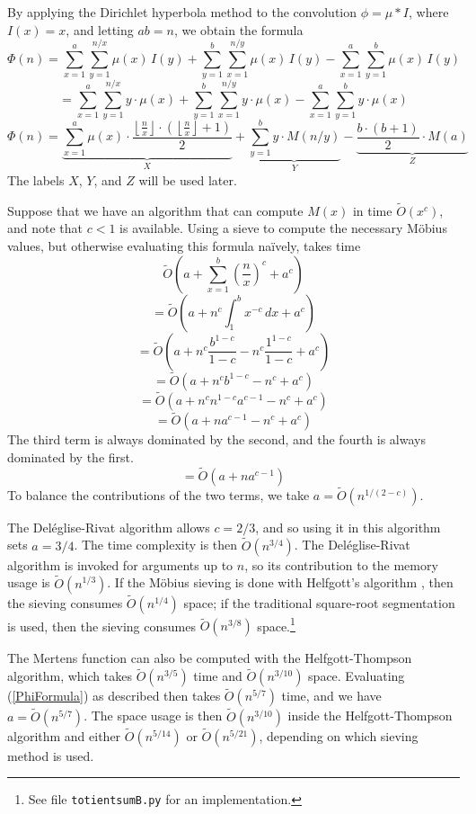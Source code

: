 \documentclass[12pt]{article}
\newcommand{\eqn}[1]{\begin{displaymath} #1 \end{displaymath}}
\newcommand{\neqn}[1]{\begin{equation} #1 \end{equation}}
\newcommand{\floor}[1]{{\left\lfloor #1 \right\rfloor}}
\newcommand{\integral}[4]{\displaystyle\int_{#3}^{#4} \! #1 \, d#2}
\newcommand{\floordiv}[2]{\floor{\frac{#1}{#2}}}
\newcommand{\softO}[0]{\widetilde{O}}
\begin{document}
By applying the Dirichlet hyperbola method to the convolution $\phi = \mu * I$, where $I(x)=x$, and letting $ab=n$, we obtain the formula
\eqn{\Phi(n) = \sum_{x=1}^{a}\sum_{y=1}^{n/x} \mu(x) \, I(y) + \sum_{y=1}^{b}\sum_{x=1}^{n/y} \mu(x) \, I(y) - \sum_{x=1}^{a}\sum_{y=1}^{b} \mu(x) \, I(y)}
\eqn{ = \sum_{x=1}^{a}\sum_{y=1}^{n/x} y \cdot \mu(x) + \sum_{y=1}^{b}\sum_{x=1}^{n/y} y \cdot \mu(x) - \sum_{x=1}^{a}\sum_{y=1}^{b} y \cdot \mu(x)}
\neqn{\Phi(n) = \underbrace{\sum_{x=1}^{a} \mu(x) \cdot \frac{\floordiv{n}{x} \cdot \left(\floordiv{n}{x} + 1\right)}{2}}_{X} + \underbrace{\sum_{y=1}^{b} y \cdot M(n/y)}_{Y} - \underbrace{\frac{b \cdot (b+1)}{2} \cdot M(a)}_{Z} \label{PhiFormula}}
The labels $X$, $Y$, and $Z$ will be used later.

Suppose that we have an algorithm that can compute $M(x)$ in time $\softO(x^c)$, and note that $c < 1$ is available.  Using a sieve to compute the necessary M\"obius values, but otherwise evaluating this formula na\"{i}vely, takes time
\eqn{\softO\left( a + \sum_{x=1}^b \left(\frac{n}{x}\right)^c + a^c \right)}
\eqn{=\softO\left( a + n^c \integral{x^{-c}}{x}{1}{b} + a^c \right)}
\eqn{=\softO\left( a + n^c\frac{b^{1-c}}{1-c} - n^c\frac{1^{1-c}}{1-c} + a^c \right)}
\eqn{=\softO\left( a + n^c b^{1-c} - n^c + a^c \right)}
\eqn{=\softO\left( a + n^c n^{1-c} a^{c-1} - n^c + a^c \right)}
\eqn{=\softO\left( a + n a^{c-1} - n^c + a^c \right)}
The third term is always dominated by the second, and the fourth is always dominated by the first.
\eqn{=\softO\left( a + n a^{c-1} \right)}
To balance the contributions of the two terms, we take $a = \softO(n^{1/(2-c)})$.

The Del\'{e}glise-Rivat algorithm \cite{DR1996} allows $c=2/3$, and so using it in this algorithm sets $a=3/4$.  The time complexity is then $\softO(n^{3/4})$. 
 The Del\'{e}glise-Rivat algorithm is invoked for arguments up to $n$, so its contribution to the memory usage is $\softO(n^{1/3})$.  If the M\"{o}bius sieving is done with Helfgott's algorithm \cite{Helfgott2020}, then the sieving consumes $\softO(n^{1/4})$ space; if the traditional square-root segmentation is used, then the sieving consumes $\softO(n^{3/8})$ space.\footnote{See file \texttt{totientsumB.py} for an implementation.}

The Mertens function can also be computed with the Helfgott-Thompson algorithm, which takes $\softO(n^{3/5})$ time and $\softO(n^{3/10})$ space.  Evaluating (\ref{PhiFormula}) as described then takes $\softO(n^{5/7})$ time, and we have $a = \softO(n^{5/7})$.  The space usage is then $\softO(n^{3/10})$ inside the Helfgott-Thompson algorithm and either $\softO(n^{5/14})$ or $\softO(n^{5/21})$, depending on which sieving method is used.
\end{document}
